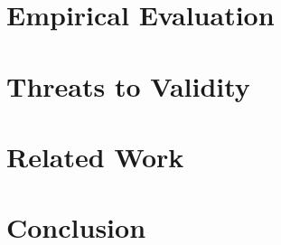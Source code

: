 \documentclass[preprint,12pt,table]{elsarticle}
\begin{document}
\section{Empirical Evaluation} 
\label{sec:evaluation}



\section{Threats to Validity}
\label{sec:threats}



\section{Related Work}
\label{sec:relatedWork}



\section{Conclusion} 
\label{sec:conclusion}



%
%


%
%
\end{document}
